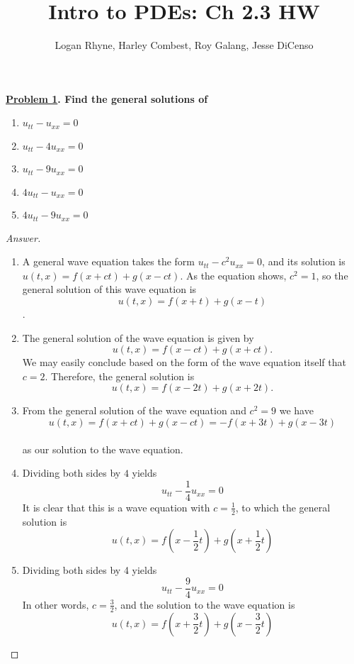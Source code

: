 \documentclass{article}
\title{Intro to PDEs: Ch 2.3 HW}
\author{Logan Rhyne, Harley Combest, Roy Galang, Jesse DiCenso}
\theoremstyle{definition}
\renewcommand\qedsymbol{$\blacksquare$}
\newenvironment{ans}{\begin{proof}[Answer]\renewcommand{\qedsymbol}{}}{\end{proof}}
\newenvironment{boldenv}{\bfseries\boldmath}{}
\begin{document}
    \maketitle

\begin{boldenv}
    \underline{Problem 1}. Find the general solutions of
    \begin{enumerate}[(1), series=problems]
        \item $u_{tt} - u_{xx} = 0$
        \item $u_{tt} - 4u_{xx} = 0$
        \item $u_{tt} - 9u_{xx} = 0$
        \item $4u_{tt} - u_{xx} = 0$
        \item $4u_{tt} - 9u_{xx} = 0$
    \end{enumerate}
\end{boldenv}
\begin{ans}
\begin{enumerate}[(1), series=answers]
    \item A general wave equation takes the form $u_{tt}-c^2u_{xx} = 0$, and its solution is $u(t,x) = f(x+ct) + g(x-ct)$. As the equation shows, $c^2 = 1$, so the general solution of this wave equation is
    \[\boxed{u(t,x) = f(x+t) + g(x-t)}\].
    \item The general solution of the wave equation is given by
    \[u(t,x) = f(x-ct) + g(x+ct).\]
    We may easily conclude based on the form of the wave equation itself that $c = 2$. Therefore, the general solution is
    \[\boxed{u(t,x) = f(x-2t) + g(x+2t)}.\]
    \item From the general solution of the wave equation and $c^2 = 9$ we have\\ 
    \[\boxed{u(t, x) = f(x + ct) + g(x-ct) =- f(x+3t) + g(x-3t)}\] \\
    as our solution to the wave equation.
    \item Dividing both sides by $4$ yields
    $$u_{tt}-\frac{1}{4}u_{xx}=0$$
    It is clear that this is a wave equation with $c=\frac{1}{2}$, to which the general solution is
    \[\boxed{u(t,x) = f\left(x-\frac{1}{2}t\right)+g\left(x+\frac{1}{2}t\right)}\]
    \item Dividing both sides by 4 yields
    \[ u_{tt} - \frac{9}{4}u_{xx} = 0 \]
    In other words, $c = \frac{3}{2}$, and the solution to the wave equation is
    \[\boxed{u(t,x)=f\left(x+\frac{3}{2}t\right) + g\left(x-\frac{3}{2}t\right)}\]
\end{enumerate}
\end{ans}
\end{document}
